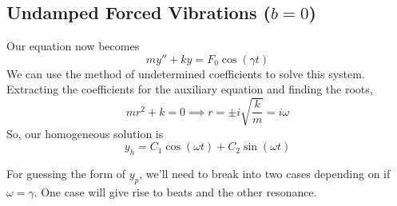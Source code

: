 \subsection{Undamped Forced Vibrations ($b = 0$)}
\noindent
Our equation now becomes
\begin{equation*}
	my'' + ky = F_0\cos{(\gamma t)}
\end{equation*}
We can use the method of undetermined coefficients to solve this system.\\

\noindent
Extracting the coefficients for the auxiliary equation and finding the roots,
\begin{equation*}
	mr^2 + k = 0 \implies r = \pm i\sqrt{\frac{k}{m}} = i\omega
\end{equation*}
So, our homogeneous solution is
\begin{equation*}
	y_h = C_1\cos{(\omega t)} + C_2\sin{(\omega t)}
\end{equation*}

\noindent
For guessing the form of $y_p$, we'll need to break into two cases depending on if $\omega = \gamma$. One case will give rise to beats and the other resonance.


